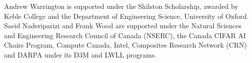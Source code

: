 Andrew Warrington is supported under the Shilston Scholarship, awarded by Keble College and the Department of Engineering Science, University of Oxford. 
Saeid Naderiparizi and Frank Wood are supported under the Natural Sciences and Engineering Research Council of Canada (NSERC), the Canada CIFAR AI Chairs Program, Compute Canada, Intel, Composites Research Network (CRN) and DARPA under its D3M and LWLL programs.